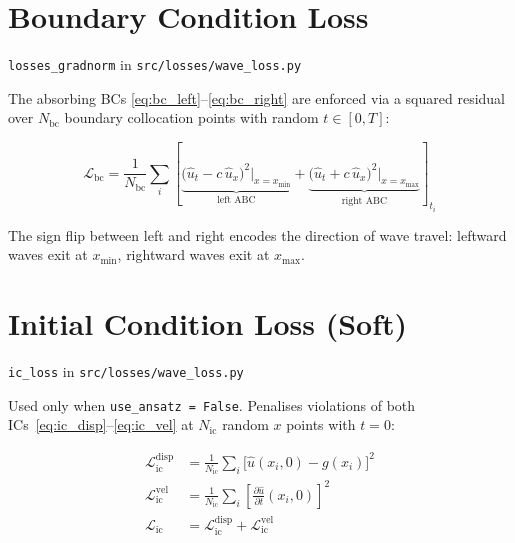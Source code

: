 \documentclass[11pt, a4paper]{article}
\newcommand{\fn}[1]{\texttt{\color{codeblue}#1}}
\newcommand{\file}[1]{\texttt{#1}}
\begin{document}
\section{Boundary Condition Loss}
\fn{losses\_gradnorm} in \file{src/losses/wave\_loss.py}

The absorbing BCs \eqref{eq:bc_left}--\eqref{eq:bc_right} are enforced
via a squared residual over $N_{\mathrm{bc}}$ boundary collocation points
with random $t \in [0,T]$:

\begin{equation}
  \mathcal{L}_{\mathrm{bc}}
  = \frac{1}{N_{\mathrm{bc}}} \sum_{i}
    \left[
      \underbrace{
        \bigl(\hat{u}_t - c\,\hat{u}_x\bigr)^2\big|_{x=x_{\min}}
      }_{\text{left ABC}}
      +
      \underbrace{
        \bigl(\hat{u}_t + c\,\hat{u}_x\bigr)^2\big|_{x=x_{\max}}
      }_{\text{right ABC}}
    \right]_{t_i}
  \label{eq:bc_loss}
\end{equation}

The sign flip between left and right encodes the direction of wave travel:
leftward waves exit at $x_{\min}$, rightward waves exit at $x_{\max}$.


\section{Initial Condition Loss (Soft)}
\label{sec:ic_loss}
\fn{ic\_loss} in \file{src/losses/wave\_loss.py}

Used only when \texttt{use\_ansatz = False}. Penalises violations of both
ICs~\eqref{eq:ic_disp}--\eqref{eq:ic_vel} at $N_{\mathrm{ic}}$ random
$x$ points with $t = 0$:

\begin{align}
  \mathcal{L}_{\mathrm{ic}}^{\mathrm{disp}}
  &= \frac{1}{N_{\mathrm{ic}}} \sum_i
     \bigl[\hat{u}(x_i, 0) - g(x_i)\bigr]^2 \\[4pt]
  \mathcal{L}_{\mathrm{ic}}^{\mathrm{vel}}
  &= \frac{1}{N_{\mathrm{ic}}} \sum_i
     \left[\frac{\partial \hat{u}}{\partial t}(x_i, 0)\right]^2 \\[4pt]
  \mathcal{L}_{\mathrm{ic}}
  &= \mathcal{L}_{\mathrm{ic}}^{\mathrm{disp}}
   + \mathcal{L}_{\mathrm{ic}}^{\mathrm{vel}}
  \label{eq:ic_loss}
\end{align}
\end{document}
